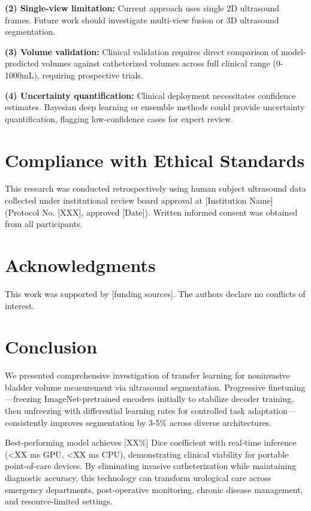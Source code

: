 \documentclass{article}
\begin{document}
\textbf{(2) Single-view limitation:} Current approach uses single 2D ultrasound frames. Future work should investigate multi-view fusion or 3D ultrasound segmentation.

\textbf{(3) Volume validation:} Clinical validation requires direct comparison of model-predicted volumes against catheterized volumes across full clinical range (0-1000mL), requiring prospective trials.

\textbf{(4) Uncertainty quantification:} Clinical deployment necessitates confidence estimates. Bayesian deep learning or ensemble methods could provide uncertainty quantification, flagging low-confidence cases for expert review.

\section{Compliance with Ethical Standards}
\label{sec:ethics}

This research was conducted retrospectively using human subject ultrasound data collected under institutional review board approval at [Institution Name] (Protocol No. [XXX], approved [Date]). Written informed consent was obtained from all participants.

\section{Acknowledgments}
\label{sec:acknowledgments}

This work was supported by [funding sources]. The authors declare no conflicts of interest.

\section{Conclusion}
\label{sec:conclusion}

We presented comprehensive investigation of transfer learning for noninvasive bladder volume measurement via ultrasound segmentation. Progressive finetuning—freezing ImageNet-pretrained encoders initially to stabilize decoder training, then unfreezing with differential learning rates for controlled task adaptation—consistently improves segmentation by 3-5\% across diverse architectures.

Best-performing model achieves [XX\%] Dice coefficient with real-time inference (<XX ms GPU, <XX ms CPU), demonstrating clinical viability for portable point-of-care devices. By eliminating invasive catheterization while maintaining diagnostic accuracy, this technology can transform urological care across emergency departments, post-operative monitoring, chronic disease management, and resource-limited settings.
\end{document}
